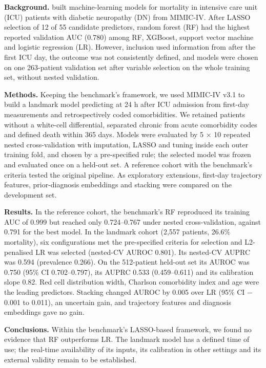 \textbf{Background.} \textcite{huang2025} built machine-learning models
for mortality in intensive care unit (ICU) patients with diabetic
neuropathy (DN) from MIMIC-IV. After LASSO selection of 12 of 55
candidate predictors, random forest (RF) had the highest reported
validation AUC (0.780) among RF, XGBoost, support vector machine and
logistic regression (LR).
However, inclusion used information from after the first ICU day, the
outcome was not consistently defined, and models were chosen on one
263-patient validation set after variable selection on the whole
training set, without nested validation.

\textbf{Methods.} Keeping the benchmark's framework, we used MIMIC-IV
v3.1 to build a landmark model predicting at 24 h after ICU admission
from first-day measurements and retrospectively coded comorbidities. We retained patients without a
white-cell differential, separated chronic from acute comorbidity codes
and defined death within 365 days. Models were evaluated by 5 × 10
repeated nested cross-validation with imputation, LASSO and tuning
inside each outer training fold, and chosen by a pre-specified rule; the selected model
was frozen and evaluated once on a held-out set. A reference cohort with
the benchmark's criteria tested the original pipeline. As exploratory
extensions, first-day trajectory features, prior-diagnosis embeddings
and stacking were compared on the development set.

\textbf{Results.} In the reference cohort, the benchmark's RF reproduced
its training AUC of 0.999 but reached only 0.724--0.767 under nested
cross-validation, against 0.791 for the best model. In the landmark
cohort (2,557 patients, 26.6\% mortality), six configurations met
the pre-specified criteria for selection and L2-penalised LR was
selected (nested-CV AUROC 0.801). Its
nested-CV AUPRC was 0.594 (prevalence 0.266). On the 512-patient
held-out set its AUROC was 0.750 (95\% CI 0.702--0.797), its AUPRC 0.533
(0.459--0.611) and its calibration slope 0.82. Red cell distribution
width, Charlson comorbidity index and age were the leading predictors.
Stacking changed AUROC by 0.005 over LR (95\% CI $-$0.001 to 0.011), an
uncertain gain, and trajectory features and diagnosis embeddings gave
no gain.

\textbf{Conclusions.} Within the benchmark's LASSO-based framework, we
found no evidence that RF outperforms LR. The landmark model has a
defined time of use; the real-time availability of its inputs, its
calibration in other settings and its external validity remain to be
established.
